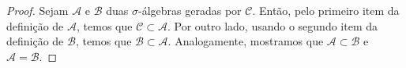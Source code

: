 \begin{proof}
    Sejam $\mathcal{A}$ e $\mathcal{B}$ duas $\sigma$-álgebras geradas por $\mathcal{C}$. Então, pelo primeiro item da definição de $\mathcal{A}$, temos que $\mathcal{C}\subset \mathcal{A}$. Por outro lado, usando o segundo item da definição de $\mathcal{B}$, temos que $\mathcal{B}\subset \mathcal{A}$. Analogamente, mostramos que $\mathcal{A}\subset \mathcal{B}$ e $\mathcal{A}=\mathcal{B}$.
\end{proof}